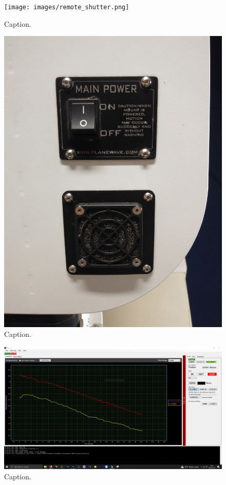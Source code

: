 \documentclass{article}
\begin{document}
	\begin{figure}[htbp!]
		\centering
		\texttt{[image: images/remote\_shutter.png]}
		\caption{Caption.}
		\label{fig:remote_shutter}
	\end{figure}

	\begin{figure}[htbp!]
		\centering
		\includegraphics[angle=270, scale=0.05]{images/mount_switch.png}
		\caption{Caption.}
		\label{fig:mount_switch}
	\end{figure}

	\begin{figure}[htbp!]
		\centering
		\includegraphics[scale=0.25]{images/pwi3-1.png}
		\caption{Caption.}
		\label{fig:pwi3-1}
	\end{figure}
	
\end{document}

